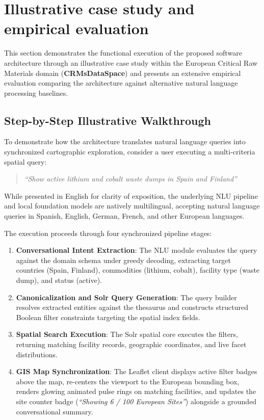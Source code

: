 \section{Illustrative case study and empirical evaluation}
\label{sec:IllustrativeExamples}

This section demonstrates the functional execution of the proposed software architecture through an illustrative case study within the European Critical Raw Materials domain (\textbf{CRMsDataSpace}) and presents an extensive empirical evaluation comparing the architecture against alternative natural language processing baselines.

\subsection{Step-by-Step Illustrative Walkthrough}
\label{subsec:Walkthrough}

To demonstrate how the architecture translates natural language queries into synchronized cartographic exploration, consider a user executing a multi-criteria spatial query:
\begin{quote}
\textit{``Show active lithium and cobalt waste dumps in Spain and Finland''}
\end{quote}
While presented in English for clarity of exposition, the underlying NLU pipeline and local foundation models are natively multilingual, accepting natural language queries in Spanish, English, German, French, and other European languages.

The execution proceeds through four synchronized pipeline stages:
\begin{enumerate}
    \item \textbf{Conversational Intent Extraction}: The NLU module evaluates the query against the domain schema under greedy decoding, extracting target countries (Spain, Finland), commodities (lithium, cobalt), facility type (waste dump), and status (active).
    \item \textbf{Canonicalization and Solr Query Generation}: The query builder resolves extracted entities against the thesaurus and constructs structured Boolean filter constraints targeting the spatial index fields.
    \item \textbf{Spatial Search Execution}: The Solr spatial core executes the filters, returning matching facility records, geographic coordinates, and live facet distributions.
    \item \textbf{GIS Map Synchronization}: The Leaflet client displays active filter badges above the map, re-centers the viewport to the European bounding box, renders glowing animated pulse rings on matching facilities, and updates the site counter badge (\textit{``Showing 6 / 100 European Sites''}) alongside a grounded conversational summary.
\end{enumerate}

